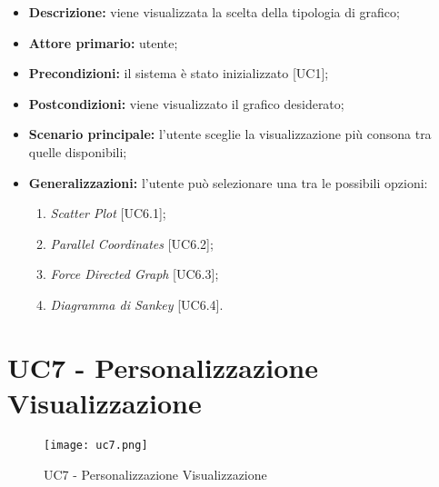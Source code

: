  \begin{itemize}
     \item \textbf{Descrizione:} viene visualizzata la scelta della tipologia di grafico;
     \item \textbf{Attore primario:} utente;
     \item \textbf{Precondizioni:} il sistema è stato inizializzato [UC1];
     \item \textbf{Postcondizioni:} viene visualizzato il grafico desiderato;
     \item \textbf{Scenario principale:} l'utente sceglie la visualizzazione più consona tra quelle disponibili;
     \item \textbf{Generalizzazioni:} l'utente può selezionare una tra le possibili opzioni:
     \begin{enumerate}
         \item \textit{Scatter Plot} [UC6.1];
         \item \textit{Parallel Coordinates} [UC6.2];
         \item \textit{Force Directed Graph} [UC6.3];
         \item \textit{Diagramma di Sankey} [UC6.4].
     \end{enumerate}
 \end{itemize}


\section{UC7 - Personalizzazione Visualizzazione}

\begin{figure}[h]
  \centering
  \texttt{[image: uc7.png]}
  \caption{UC7 - Personalizzazione Visualizzazione}
\end{figure}

